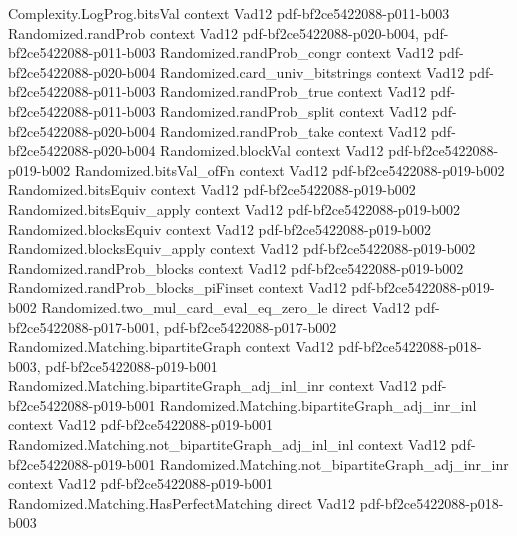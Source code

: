 \begin{theorem}
\label{Randomized.Matching.lovasz_test_int}
\leanok
\proofstep
  {Complexity.LogProg.bitsVal}
  {context}
  {Vad12}
  {pdf-bf2ce5422088-p011-b003}
\proofstep
  {Randomized.randProb}
  {context}
  {Vad12}
  {pdf-bf2ce5422088-p020-b004,
    pdf-bf2ce5422088-p011-b003}
\proofstep
  {Randomized.randProb_congr}
  {context}
  {Vad12}
  {pdf-bf2ce5422088-p020-b004}
\proofstep
  {Randomized.card_univ_bitstrings}
  {context}
  {Vad12}
  {pdf-bf2ce5422088-p011-b003}
\proofstep
  {Randomized.randProb_true}
  {context}
  {Vad12}
  {pdf-bf2ce5422088-p011-b003}
\proofstep
  {Randomized.randProb_split}
  {context}
  {Vad12}
  {pdf-bf2ce5422088-p020-b004}
\proofstep
  {Randomized.randProb_take}
  {context}
  {Vad12}
  {pdf-bf2ce5422088-p020-b004}
\proofstep
  {Randomized.blockVal}
  {context}
  {Vad12}
  {pdf-bf2ce5422088-p019-b002}
\proofstep
  {Randomized.bitsVal_ofFn}
  {context}
  {Vad12}
  {pdf-bf2ce5422088-p019-b002}
\proofstep
  {Randomized.bitsEquiv}
  {context}
  {Vad12}
  {pdf-bf2ce5422088-p019-b002}
\proofstep
  {Randomized.bitsEquiv_apply}
  {context}
  {Vad12}
  {pdf-bf2ce5422088-p019-b002}
\proofstep
  {Randomized.blocksEquiv}
  {context}
  {Vad12}
  {pdf-bf2ce5422088-p019-b002}
\proofstep
  {Randomized.blocksEquiv_apply}
  {context}
  {Vad12}
  {pdf-bf2ce5422088-p019-b002}
\proofstep
  {Randomized.randProb_blocks}
  {context}
  {Vad12}
  {pdf-bf2ce5422088-p019-b002}
\proofstep
  {Randomized.randProb_blocks_piFinset}
  {context}
  {Vad12}
  {pdf-bf2ce5422088-p019-b002}
\proofstep
  {Randomized.two_mul_card_eval_eq_zero_le}
  {direct}
  {Vad12}
  {pdf-bf2ce5422088-p017-b001,
    pdf-bf2ce5422088-p017-b002}
\proofstep
  {Randomized.Matching.bipartiteGraph}
  {context}
  {Vad12}
  {pdf-bf2ce5422088-p018-b003,
    pdf-bf2ce5422088-p019-b001}
\proofstep
  {Randomized.Matching.bipartiteGraph_adj_inl_inr}
  {context}
  {Vad12}
  {pdf-bf2ce5422088-p019-b001}
\proofstep
  {Randomized.Matching.bipartiteGraph_adj_inr_inl}
  {context}
  {Vad12}
  {pdf-bf2ce5422088-p019-b001}
\proofstep
  {Randomized.Matching.not_bipartiteGraph_adj_inl_inl}
  {context}
  {Vad12}
  {pdf-bf2ce5422088-p019-b001}
\proofstep
  {Randomized.Matching.not_bipartiteGraph_adj_inr_inr}
  {context}
  {Vad12}
  {pdf-bf2ce5422088-p019-b001}
\proofstep
  {Randomized.Matching.HasPerfectMatching}
  {direct}
  {Vad12}
  {pdf-bf2ce5422088-p018-b003}
\proofstep

\end{theorem}
